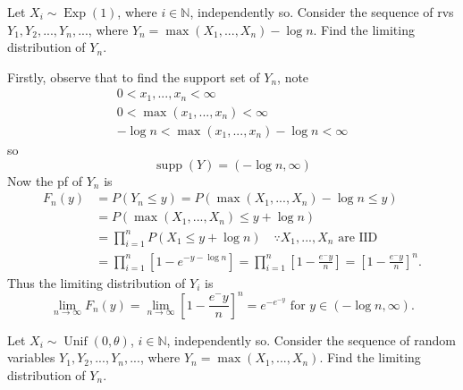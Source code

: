 \documentclass[notoc,notitlepage]{tufte-book}
\DeclareMathOperator{\Exp}{Exp }
\DeclareMathOperator{\Unif}{Unif }
\DeclareMathOperator{\supp}{supp }
\begin{document}
\begin{eg}
  Let $X_i \sim \Exp(1)$, where $i \in \mathbb{N}$, independently so. Consider the sequence of rvs $Y_1, Y_2, ..., Y_n, ...$, where $Y_n = \max( X_1, ..., X_n ) - \log n$. Find the limiting distribution of $Y_n$.
\end{eg}

\begin{solution}
  Firstly, observe that to find the support set of $Y_n$, note
  \begin{gather*}
    0 < x_1, ..., x_n < \infty \\
    0 < \max( x_1, ..., x_n ) < \infty \\
    -\log n < \max( x_1, ..., x_n ) - \log n < \infty
  \end{gather*}
  so
  \begin{equation*}
    \supp(Y) = (- \log n, \infty)
  \end{equation*}
  Now the pf of $Y_n$ is
  \begin{align*}
    F_n(y) &= P(Y_n \leq y) = P( \max(X_1, ..., X_n) - \log n \leq y ) \\
           &= P( \max(X_1, ..., X_n) \leq y + \log n ) \\
           &= \prod_{i=1}^{n} P(X_1 \leq y + \log n) \quad \because X_1, ..., X_n \text{ are IID } \\
           &= \prod_{i=1}^{n} \left[ 1 - e^{- y - \log n} \right] = \prod_{i=1}^{n} \left[ 1 - \frac{e^-y}{n} \right] = \left[ 1 - \frac{e^-y}{n} \right]^n.
  \end{align*}
  Thus the limiting distribution of $Y_i$ is
  \begin{equation*}
    \lim_{n \to \infty} F_n(y) = \lim_{n \to \infty} \left[ 1 - \frac{e^-y}{n} \right]^n = e^{-e^{-y}} \text{ for } y \in ( -\log n, \infty ).
  \end{equation*}
\end{solution}

\begin{eg}
  Let $X_i \sim \Unif(0, \theta)$, $i \in \mathbb{N}$, independently so. Consider the sequence of random variables $Y_1, Y_2, ..., Y_n, ...$, where $Y_n = \max(X_1, ..., X_n)$. Find the limiting distribution of $Y_n$.
\end{eg}
\end{document}
